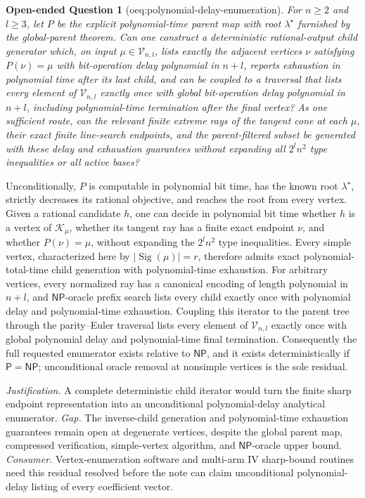 \documentclass{article}
\newtheorem{openendedquestion}{Open-ended Question}
\begin{document}
\begin{openendedquestion}[oeq:polynomial-delay-enumeration]\label{oeq:polynomial-delay-enumeration}
For \(n\ge2\) and \(l\ge3\), let \(P\) be the explicit polynomial-time parent map with root \(\lambda^\star\) furnished by the global-parent theorem. Can one construct a deterministic rational-output child generator which, on input \(\mu\in\mathcal V_{n,l}\), lists exactly the adjacent vertices \(\nu\) satisfying \(P(\nu)=\mu\) with bit-operation delay polynomial in \(n+l\), reports exhaustion in polynomial time after its last child, and can be coupled to a traversal that lists every element of \(\mathcal V_{n,l}\) exactly once with global bit-operation delay polynomial in \(n+l\), including polynomial-time termination after the final vertex? As one sufficient route, can the relevant finite extreme rays of the tangent cone at each \(\mu\), their exact finite line-search endpoints, and the parent-filtered subset be generated with these delay and exhaustion guarantees without expanding all \(2^l n^2\) type inequalities or all active bases?
\end{openendedquestion}
Unconditionally, \(P\) is computable in polynomial bit time, has the known root \(\lambda^\star\), strictly decreases its rational objective, and reaches the root from every vertex. Given a rational candidate \(h\), one can decide in polynomial bit time whether \(h\) is a vertex of \(\mathcal K_\mu\), whether its tangent ray has a finite exact endpoint \(\nu\), and whether \(P(\nu)=\mu\), without expanding the \(2^l n^2\) type inequalities. Every simple vertex, characterized here by \(|\operatorname{Sig}(\mu)|=r\), therefore admits exact polynomial-total-time child generation with polynomial-time exhaustion. For arbitrary vertices, every normalized ray has a canonical encoding of length polynomial in \(n+l\), and \(\mathsf{NP}\)-oracle prefix search lists every child exactly once with polynomial delay and polynomial-time exhaustion. Coupling this iterator to the parent tree through the parity--Euler traversal lists every element of \(\mathcal V_{n,l}\) exactly once with global polynomial delay and polynomial-time final termination. Consequently the full requested enumerator exists relative to \(\mathsf{NP}\), and it exists deterministically if \(\mathsf P=\mathsf{NP}\); unconditional oracle removal at nonsimple vertices is the sole residual.
\par\smallskip\noindent \textit{Justification.} A complete deterministic child iterator would turn the finite sharp endpoint representation into an unconditional polynomial-delay analytical enumerator. \textit{Gap.} The inverse-child generation and polynomial-time exhaustion guarantees remain open at degenerate vertices, despite the global parent map, compressed verification, simple-vertex algorithm, and \(\mathsf{NP}\)-oracle upper bound. \textit{Consumer.} Vertex-enumeration software and multi-arm IV sharp-bound routines need this residual resolved before the note can claim unconditional polynomial-delay listing of every coefficient vector.
\end{document}
